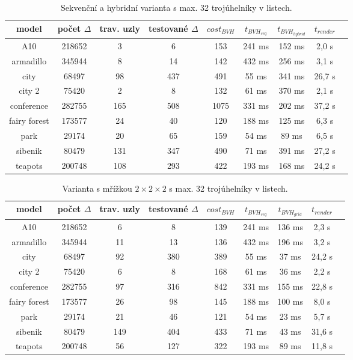 \documentclass[11pt]{article}
\begin{document}
\begin{table}[h]
\begin{center}
\begin{tabular}{|c|c|c|c|c|c|c|c|c|}
\hline
model & počet $\Delta$ & trav. uzly & testované $\Delta$ & $cost_{BVH}$ & $t_{BVH_{seq}}$ & $t_{BVH_{hybrid}}$ & $t_{render}$\\
\hline
A10 & 218652 & 3 & 6 & 153 & 241 ms & 152 ms & 2,0 s\\
\hline
armadillo & 345944 & 8 & 14 & 142 & 432 ms & 256 ms & 3,1 s\\
\hline
city & 68497 & 98 & 437 & 491 & 55 ms & 341 ms & 26,7 s\\
\hline
city 2 & 75420 & 2 & 8 & 132 & 61 ms & 370 ms & 2,1 s\\
\hline
conference & 282755 & 165 & 508 & 1075 & 331 ms & 202 ms & 37,2 s\\
\hline
fairy forest & 173577 & 24 & 40 & 120 & 188 ms & 125 ms & 6,3 s\\
\hline
park & 29174 & 20 & 65 & 159 & 54 ms & 89 ms & 6,5 s\\
\hline
sibenik & 80479 & 131 & 347 & 490 & 71 ms & 391 ms & 27,2 s\\
\hline
teapots & 200748 & 108 & 293 & 422 & 193 ms & 168 ms & 24,2 s\\
\hline
\end{tabular}
\end{center}
\caption{Sekvenční a hybridní varianta s max. 32 trojúhelníky v listech.}
\label{test32seq}
\end{table}

\begin{table}[h]
\begin{center}
\begin{tabular}{|c|c|c|c|c|c|c|c|c|}
\hline
model & počet $\Delta$ & trav. uzly & testované $\Delta$ & $cost_{BVH}$ & $t_{BVH_{seq}}$ & $t_{BVH_{grid}}$ & $t_{render}$\\
\hline
A10 & 218652 & 6 & 8 & 139 & 241 ms & 136 ms & 2,3 s\\
\hline
armadillo & 345944 & 11 & 13 & 136 & 432 ms & 196 ms & 3,2 s\\
\hline
city & 68497 & 92 & 380 & 389 & 55 ms & 37 ms & 24,2 s\\
\hline
city 2 & 75420 & 6 & 8 & 168 & 61 ms & 36 ms & 2,2 s\\
\hline
conference & 282755 & 97 & 316 & 842 & 331 ms & 155 ms & 22,8 s\\
\hline
fairy forest & 173577 & 26 & 98 & 145 & 188 ms & 100 ms & 8,0 s\\
\hline
park & 29174 & 21 & 46 & 121 & 54 ms & 23 ms & 5,7 s\\
\hline
sibenik & 80479 & 149 & 404 & 433 & 71 ms & 43 ms & 31,6 s\\
\hline
teapots & 200748 & 56 & 127 & 322 & 193 ms & 89 ms & 11,8 s\\
\hline
\end{tabular}
\end{center}
\caption{Varianta s mřížkou $2 \times 2 \times 2$ s max. 32 trojúhelníky v listech.}
\label{test32grid}
\end{table}
\end{document}
